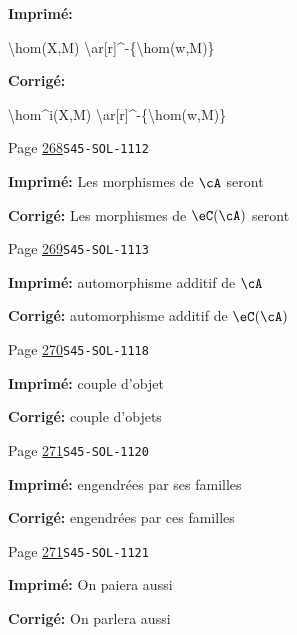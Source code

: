 \documentclass[oneside]{book}
\theoremstyle{sga-source}
\theoremstyle{sga-source-dash}
\theoremstyle{sga-source-dotdash}
\theoremstyle{sga-source-number-note-dash}
\theoremstyle{sga-source-note-number-dotdash}
\theoremstyle{sga-source-example-dotdash}
\theoremstyle{sga-source-inline-number}
\theoremstyle{sga-source-bare-number}
\theoremstyle{sga-source}
\begin{document}
\begin{description}
\par\noindent\textbf{Imprimé:} {\footnotesize\ttfamily\raggedright \textbackslash{}\allowbreak{}hom(\allowbreak{}X,\allowbreak{}M)\allowbreak{} \textbackslash{}\allowbreak{}ar[\allowbreak{}r]\allowbreak{}\textasciicircum{}\allowbreak{}-\allowbreak{}\{\allowbreak{}\textbackslash{}\allowbreak{}hom(\allowbreak{}w,\allowbreak{}M)\allowbreak{}\}\allowbreak{}\par}
\par\noindent\textbf{Corrigé:} {\footnotesize\ttfamily\raggedright \textbackslash{}\allowbreak{}hom\textasciicircum{}\allowbreak{}i(\allowbreak{}X,\allowbreak{}M)\allowbreak{} \textbackslash{}\allowbreak{}ar[\allowbreak{}r]\allowbreak{}\textasciicircum{}\allowbreak{}-\allowbreak{}\{\allowbreak{}\textbackslash{}\allowbreak{}hom(\allowbreak{}w,\allowbreak{}M)\allowbreak{}\}\allowbreak{}\par}
\smallskip
\item[\hypertarget{apparatus:FR-0277}{277}] Page \hyperlink{printpage:fr:268}{268}\quad\texttt{S45-SOL-1112}
\par\noindent\textbf{Imprimé:} Les morphismes de $\cA$ seront
\par\noindent\textbf{Corrigé:} Les morphismes de $\eC(\cA)$ seront
\smallskip
\item[\hypertarget{apparatus:FR-0278}{278}] Page \hyperlink{printpage:fr:269}{269}\quad\texttt{S45-SOL-1113}
\par\noindent\textbf{Imprimé:} automorphisme additif de $\cA$
\par\noindent\textbf{Corrigé:} automorphisme additif de $\eC(\cA)$
\smallskip
\item[\hypertarget{apparatus:FR-0279}{279}] Page \hyperlink{printpage:fr:270}{270}\quad\texttt{S45-SOL-1118}
\par\noindent\textbf{Imprimé:} couple d'objet
\par\noindent\textbf{Corrigé:} couple d'objets
\smallskip
\item[\hypertarget{apparatus:FR-0280}{280}] Page \hyperlink{printpage:fr:271}{271}\quad\texttt{S45-SOL-1120}
\par\noindent\textbf{Imprimé:} engendrées par ses familles
\par\noindent\textbf{Corrigé:} engendrées par ces familles
\smallskip
\item[\hypertarget{apparatus:FR-0281}{281}] Page \hyperlink{printpage:fr:271}{271}\quad\texttt{S45-SOL-1121}
\par\noindent\textbf{Imprimé:} On paiera aussi
\par\noindent\textbf{Corrigé:} On parlera aussi

\end{description}
\end{document}
